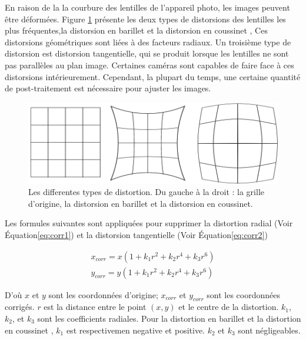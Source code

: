 \documentclass[
]{article}
\begin{document}
En raison de la la courbure des lentilles de l'appareil photo, les images peuvent être déformées. Figure \ref{fig:lens} présente les deux types de distorsions des lentilles les plus fréquentes,la distorsion en barillet et la distorsion en coussinet \citep{fryer_lens_1986} , Ces distorsions géométriques sont liées à des facteurs radiaux. Un troisième type de distorsion est distorsion tangentielle, qui se produit lorsque les lentilles ne sont pas parallèles au plan
image. Certaines caméras sont capables de faire face à ces distorsions
intérieurement. Cependant, la plupart du temps, une certaine quantité de post-traitement est
nécessaire pour ajuster les images.



\begin{figure}
\includegraphics[width=1\linewidth]{images/lens} \caption{Les differentes types de distortion. Du gauche à la droit : la grille d'origine, la distorsion en barillet et la distorsion en coussinet.}\label{fig:lens}
\end{figure}

Les formules suivantes sont appliquées pour supprimer la distortion radial (Voir Équation\eqref{eq:corr1}) et la distorsion tangentielle (Voir Équation\eqref{eq:corr2})

\begin{equation}
\begin{aligned}
  x_{corr} = x\left(1+k_1r^2+k_2r^4+k_3r^6\right)
  \\y_{corr} = y\left(1+k_1r^2+k_2r^4+k_3r^6\right)
\end{aligned}
 \label{eq:corr1}
\end{equation}

D'où \(𝑥\) et \(𝑦\) sont les coordonnées d'origine; \(x_{𝑐𝑜𝑟𝑟}\) et
\(y_{𝑐𝑜𝑟𝑟}\) sont les coordonnées corrigés. \(𝑟\) est la distance entre le
point \(\left(𝑥, 𝑦\right)\) et le centre de la distortion. \(𝑘_1\), \(𝑘_2\),
et \(𝑘_3\) sont les coefficients radiales. Pour la distortion en barillet et la distortion en coussinet , \(𝑘_1\) est respectivemen negative et positive. \(𝑘_2\) et \(𝑘_3\) sont négligeables.
\end{document}
